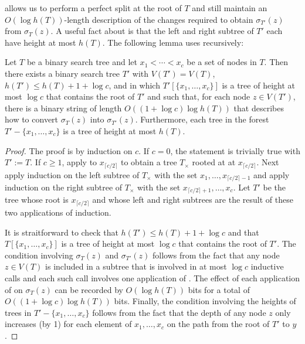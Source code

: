 \documentclass[kpfonts]{patmorin}
\begin{document}
 allows us to perform a perfect split at the root of $T$ and still maintain an $O(\log h(T))$-length description of the changes required to obtain $\sigma_{T'}(z)$ from $\sigma_T(z)$.  A useful fact about  is that the left and right subtree of $T'$ each have height at most $h(T)$.
The following lemma uses  recursively:

\begin{lem}
  Let $T$ be a binary search tree and let $x_1<\cdots<x_c$ be a set of nodes in $T$. Then there exists a binary search tree $T'$ with $V(T')=V(T)$, $h(T')\le h(T)+1+\log c$, and in which $T'[\{x_1,\ldots,x_c\}]$ is a tree of height at most $\log c$ that contains the root of $T'$ and such that, for each node $z\in V(T')$, there is a binary string of length $O((1+\log c)\log h(T))$ that describes how to convert $\sigma_T(z)$ into $\sigma_{T'}(z)$.  Furthermore, each tree in the forest $T'-\{x_1,\ldots,x_c\}$ is a tree of height at most $h(T)$.
\end{lem}

\begin{proof}
  The proof is by induction on $c$.  If $c=0$, the statement is trivially true with $T':=T$.  If $c\ge 1$,  apply  to $x_{\lceil c/2\rceil}$ to obtain a tree $T_\times$ rooted at at $x_{\lceil c/2\rceil}$.  Next apply induction on the left subtree of $T_\times$ with the set $x_1,\ldots,x_{\lceil c/2\rceil -1}$ and apply induction on the right subtree of $T_\times$ with the set $x_{\lceil c/2\rceil +1},\ldots,x_c$.  Let $T'$ be the tree whose root is $x_{\lceil c/2\rceil}$ and whose left and right subtrees are the result of these two applications of induction.
  
  It is straitforward to check that $h(T')\le h(T)+1+\log c$ and that $T[\{x_1,\ldots,x_c\}]$ is a tree of height at most $\log c$ that contains the root of $T'$.  The condition involving $\sigma_T(z)$ and $\sigma_{T'}(z)$ follows from the fact that any node $z\in V(T)$ is included in a subtree that is involved in at most $\log c$ inductive calls and each such call involves one application of .  The effect of each application of  on $\sigma_T(z)$ can be recorded by $O(\log h(T))$ bits for a total of $O((1+\log c)\log h(T))$ bits.  Finally, the condition involving the heights of trees in $T'-\{x_1,\ldots,x_c\}$ follows from the fact that the depth of any node $z$ only increases (by 1) for each element of $x_1,\ldots,x_c$ on the path from the root of $T'$ to $y$.
\end{proof}
\end{document}
